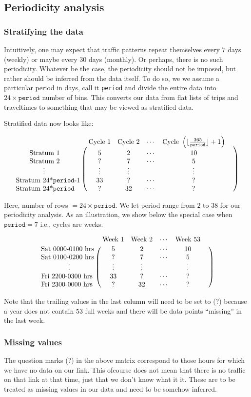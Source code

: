 \documentclass[10pt,a4paper]{amsart}
\begin{document}
\subsection{Periodicity analysis}
\subsubsection{Stratifying the data}
Intuitively, one may expect that traffic patterns repeat themselves
every \(7\) days (weekly) or maybe every \(30\) days (monthly). Or
perhaps, there is no such periodicity. Whatever be the case, the
periodicity should not be imposed, but rather should be inferred
from the data itself. To do so, we we assume a particular period in
days, call it \texttt{period} and divide the entire data into
\(24\times\mathtt{period}\) number of bins. This converts our data
from flat lists of trips and traveltimes to something that may be
viewed as stratified data. 

Stratified data now looks like:

\[\bordermatrix{
	~ & \text{Cycle 1} & \text{Cycle 2} & \cdots &\text{Cycle }\left(
		\lfloor\frac{365}{\mathtt{period}}\rfloor+1\right)&\cr
	\qquad\text{Stratum 1} & 5 & 2 & \cdots & 10 \cr
	\qquad\text{Stratum 2} & ? & 7 & \cdots & 5 \cr
	\qquad\qquad\vdots & \vdots & \vdots & ~ & \vdots \cr
	\text{Stratum 24*\texttt{period}-1} & 33 & ? & \cdots & ? \cr
	\text{Stratum 24*\texttt{period}} & ? & 32 & \cdots & ? \cr	}\]

Here, number of rows \(=24\times\mathtt{period}\). We let period range from
\(2\) to \(38\) for our periodicity analysis. As an illustration, we show
below the special case when \(\mathtt{period} = 7\) i.e., cycles are weeks.

\[\bordermatrix{
	~ & \text{Week 1} & \text{Week 2} & \cdots & \text{Week 53} & \cr
    	\text{Sat 0000-0100 hrs} & 5 & 2 & \cdots & 10 \cr
    	\text{Sat 0100-0200 hrs} & ? & 7 & \cdots & 5 \cr
    	\qquad\qquad\vdots & \vdots & \vdots & ~ & \vdots \cr
	\text{Fri 2200-0300 hrs} & 33 & ? & \cdots & ? \cr
	\text{Fri 2300-0000 hrs} & ? & 32 & \cdots & ? \cr	}\]

Note that the trailing values in the last column will need to be set to (?)
because a year does not contain \(53\) full weeks and there will be data
points ``missing'' in the last week.

\subsubsection{Missing values}
The question marks (?) in the above matrix correspond to those hours for which
we have no data on our link. This ofcourse does not mean that there is no
traffic on that link at that time, just that we don't know what it it. These
are to be treated as missing values in our data and need to be somehow
inferred.
\end{document}
